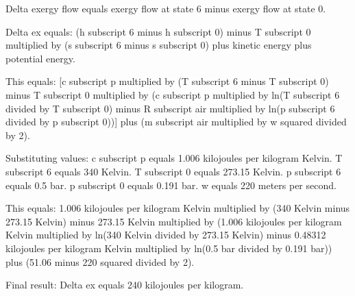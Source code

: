 Delta exergy flow equals exergy flow at state 6 minus exergy flow at state 0.  

Delta ex equals:  
(h subscript 6 minus h subscript 0) minus T subscript 0 multiplied by (s subscript 6 minus s subscript 0) plus kinetic energy plus potential energy.  

This equals:  
[c subscript p multiplied by (T subscript 6 minus T subscript 0) minus T subscript 0 multiplied by (c subscript p multiplied by ln(T subscript 6 divided by T subscript 0) minus R subscript air multiplied by ln(p subscript 6 divided by p subscript 0))] plus (m subscript air multiplied by w squared divided by 2).  

Substituting values:  
c subscript p equals 1.006 kilojoules per kilogram Kelvin.  
T subscript 6 equals 340 Kelvin.  
T subscript 0 equals 273.15 Kelvin.  
p subscript 6 equals 0.5 bar.  
p subscript 0 equals 0.191 bar.  
w equals 220 meters per second.  

This equals:  
1.006 kilojoules per kilogram Kelvin multiplied by (340 Kelvin minus 273.15 Kelvin) minus 273.15 Kelvin multiplied by (1.006 kilojoules per kilogram Kelvin multiplied by ln(340 Kelvin divided by 273.15 Kelvin) minus 0.48312 kilojoules per kilogram Kelvin multiplied by ln(0.5 bar divided by 0.191 bar)) plus (51.06 minus 220 squared divided by 2).  

Final result:  
Delta ex equals 240 kilojoules per kilogram.